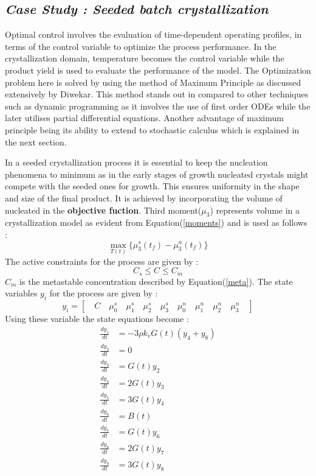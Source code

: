 \documentclass[3p,times]{elsarticle}
\begin{document}
\subsection{\textit{Case Study : Seeded batch crystallization}}
Optimal control involves the evaluation of time-dependent operating profiles, in terms of the control variable to optimize the process performance. In the crystallization domain, temperature becomes the control variable while the product yield is used to evaluate the performance of the model. The Optimization problem here is solved by using the method of Maximum Principle as discussed extensively by Diwekar\cite{dewikar}. This method stands out in compared to other techniques such as dynamic programming as it involves the use of first order ODEs while the later utilises partial differential equations. Another advantage of maximum principle being its ability to extend to stochastic calculus which is explained in the next section. \par 
In a seeded crystallization process it is essential to keep the nucleation phenomena to minimum as in the early stages of growth nucleated crystals might compete with the seeded ones for growth. This ensures uniformity in the shape and size of the final product. It is achieved by incorporating the volume of nucleated in the \textbf{objective fuction}. Third moment($\mu_{3}$) represents volume in a crystallization model as evident from Equation(\ref{moments}) and is used as follows :
\begin{equation}
\max_{T(t)}\lbrace{\mu_{3}^{s}(t_{f}) - \mu_{3}^{n}(t_{f})\rbrace } 
\end{equation}
The active constraints for the process are given by : 
\begin{equation}
C_{s}\leqslant C \leqslant C_{m}
\end{equation}
$C_{m}$ is the metastable concentration described by Equation(\ref{meta}). The state variables $y_{i}$ for the process are given by : 
\begin{equation*}
y_{i} = \left[\quad C \quad \mu_{0}^{s} \quad \mu_{1}^{s}\quad \mu_{2}^{s}\quad \mu_{3}^{s}\quad \mu_{0}^{n}\quad \mu_{1}^{n}\quad \mu_{2}^{n}\quad \mu_{3}^{n}\quad\right]  
\end{equation*}
Using these variable the state equations become \cite{yenkie} :
\begin{align} 
\frac{dy_{1}}{dt} &= -3\rho k_{v}G(t)(y_{4}+y_{8}) \\
\frac{dy_{2}}{dt} &= 0 \\
\frac{dy_{3}}{dt} &= G(t)y_{2}  \\
\frac{dy_{4}}{dt} &= 2G(t)y_{3} \\
\frac{dy_{5}}{dt} &= 3G(t)y_{4} \\
\frac{dy_{6}}{dt} &= B(t)  \\
\frac{dy_{7}}{dt} &= G(t)y_{6}  \\
\frac{dy_{8}}{dt} &= 2G(t)y_{7}  \\
\frac{dy_{9}}{dt} &= 3G(t)y_{8}  \\
\end{align} 
\end{document}
